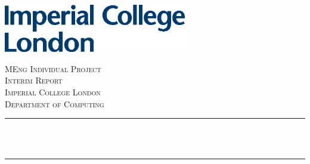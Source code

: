 \begin{titlepage}

\newcommand{\HRule}{\rule{\linewidth}{0.5mm}} %


\includegraphics[width=8cm]{title/logo.eps}\\[1cm] %
 

\center %


\textsc{\LARGE MEng Individual Project}\\[0.5cm] %
\textsc{\LARGE Interim Report}\\[1.5cm] %
\textsc{\Large Imperial College London}\\[0.3cm] %
\textsc{\large Department of Computing}\\[1cm] %

\makeatletter
\HRule \\[0.25cm]
{ \LARGE \bfseries \@title}\\[0.15cm] %
\HRule \\[1.8cm]
 


\end{titlepage}
